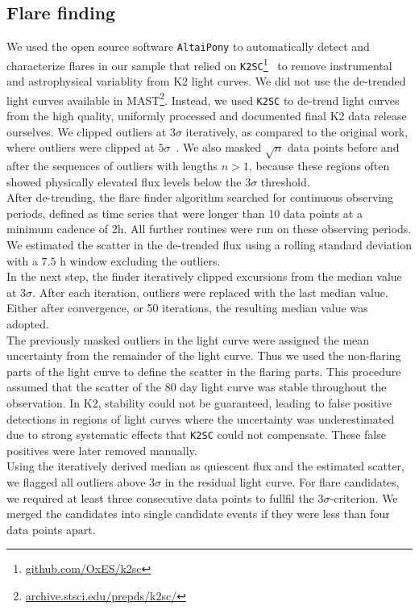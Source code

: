 \documentclass{aa}
\begin{document}
\subsection{Flare finding}
\label{sec:sec:flarefinding}
We used the open source software \texttt{AltaiPony} to automatically detect and characterize flares in our sample that relied on \texttt{K2SC}\footnote{\url{github.com/OxES/k2sc}}~\citep{aigrain_k2sc_2016} to remove instrumental and astrophysical variablity from K2 light curves. We did not use the de-trended light curves available in MAST\footnote{\url{archive.stsci.edu/prepds/k2sc/}}. Instead, we used \texttt{K2SC} to de-trend light curves from the high quality, uniformly processed and documented final K2 data release ourselves. We clipped outliers at $3\sigma$ iteratively, as compared to the original work, where outliers were clipped at $5\sigma$~\citep{aigrain_k2sc_2016}. We also masked $\sqrt{n}$ data points before and after the sequences of outliers with lengths $n>1$, because these regions often showed physically elevated flux levels below the $3\sigma$ threshold.
\\
After de-trending, the flare finder algorithm searched for continuous observing periods, defined as time series that were longer than 10 data points at a minimum cadence of 2\;h. All further routines were run on these observing periods. We estimated the scatter in the de-trended flux using a rolling standard deviation with a $7.5$ h window excluding the outliers. 
\\
In the next step, the finder iteratively clipped excursions from the median value at $3\sigma$. After each iteration, outliers were replaced with the last median value. Either after convergence, or 50 iterations, the resulting median value was adopted. 
\\
The previously masked outliers in the light curve were assigned the mean uncertainty from the remainder of the light curve. Thus we used the non-flaring parts of the light curve to define the scatter in the flaring parts. This procedure assumed that the scatter of the 80 day light curve was stable throughout the observation. In K2, stability could not be guaranteed, leading to false positive detections in regions of light curves where the uncertainty was underestimated due to strong systematic effects that \texttt{K2SC} could not compensate. These false positives were later removed manually. 
\\
Using the iteratively derived median as quiescent flux and the estimated scatter, we flagged all outliers above $3\sigma$ in the residual light curve. For flare candidates, we required at least three consecutive data points to fullfil the $3\sigma$-criterion. We merged the candidates into single candidate events if they were less than four data points apart. 
\end{document}
